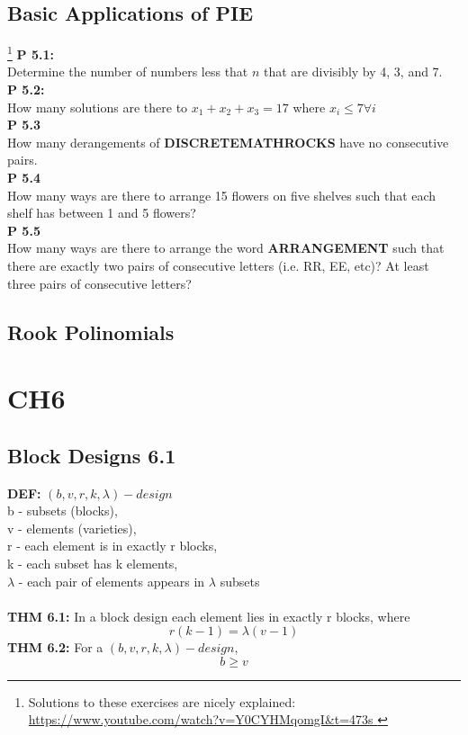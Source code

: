 \documentclass[12pt]{article}
\begin{document}
	\subsection{Basic Applications of PIE}
	\footnote{Solutions to these exercises are nicely explained: \href{https://www.youtube.com/watch?v=Y0CYHMqomgI&t=473s}{https://www.youtube.com/watch?v=Y0CYHMqomgI\&t=473s }}
		\textbf{P 5.1:}\\
		Determine the number of numbers less that $n$ that are divisibly by 4, 3, and 7.\\
		\textbf{P 5.2:}\\
		How many solutions are there to $x_1 + x_2 + x_3 = 17$ where $x_i \leq 7 \forall i$\\
		\textbf{P 5.3}\\
		How many derangements of \textbf{DISCRETEMATHROCKS} have no consecutive pairs.\\
		\textbf{P 5.4}\\
		How many ways are there to arrange 15 flowers on five shelves such that each shelf has between 1 and 5 flowers?\\
		\textbf{P 5.5}\\
		How many ways are there to arrange the word \textbf{ARRANGEMENT} such that there are exactly two pairs of consecutive letters (i.e. RR, EE, etc)? At least three pairs of consecutive letters?\\
		
	\subsection{Rook Polinomials}
		
		
	
	\section{CH6}
	\subsection{Block Designs 6.1}
	\textbf{DEF:} $ (b,v,r,k,\lambda)-design $ \\
	b - subsets (blocks),\\
	v - elements (varieties),\\
	r - each element is in exactly r blocks, \\
	k - each subset has k elements, \\
	$ \lambda $ - each pair of elements appears in $ \lambda $ subsets\\\\
	\textbf{THM 6.1:} In a block design each element lies in exactly r blocks, where
	\[ 	r(k-1) = \lambda(v-1) \]
	\textbf{THM 6.2:}  For a  $ (b,v,r,k,\lambda)-design $, 
	\[ b \geq v \]
	
\end{document}
